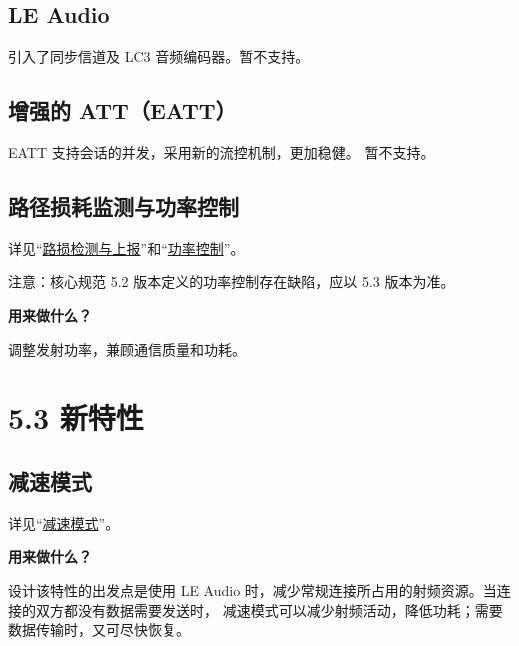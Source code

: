 \documentclass[
  12pt,
]{book}
\makeatletter
\newenvironment{kframe}{%
\medskip{}
\setlength{\fboxsep}{.8em}
 \def\at@end@of@kframe{}%
 \ifinner\ifhmode%
  \def\at@end@of@kframe{\end{minipage}}%
  \begin{minipage}{\columnwidth}%
 \fi\fi%
 \def\FrameCommand##1{\hskip\@totalleftmargin \hskip-\fboxsep
 \colorbox{shadecolor}{##1}\hskip-\fboxsep
     \hskip-\linewidth \hskip-\@totalleftmargin \hskip\columnwidth}%
 \MakeFramed {\advance\hsize-\width
   \@totalleftmargin\z@ \linewidth\hsize
   \@setminipage}}%
 {\par\unskip\endMakeFramed%
 \at@end@of@kframe}
\newenvironment{rmdblock}[1]
  {
  \begin{itemize}
  \renewcommand{\labelitemi}{
    \raisebox{-.7\height}[0pt][0pt]{
      {\setkeys{Gin}{width=3em,keepaspectratio}\texttt{[image: images/\#1]}}
    }
  }
  \setlength{\fboxsep}{1em}
  \begin{kframe}
  \item
  }
  {
  \end{kframe}
  \end{itemize}
  }
\newenvironment{rmdnote}
  {\begin{rmdblock}{note}}
  {\end{rmdblock}}
\makeatother
\begin{document}
\hypertarget{le-audio}{%
\subsection{LE Audio}\label{le-audio}}

引入了同步信道及 LC3 音频编码器。暂不支持。

\hypertarget{ux589eux5f3aux7684-atteatt}{%
\subsection{增强的 ATT（EATT）}\label{ux589eux5f3aux7684-atteatt}}

EATT 支持会话的并发，采用新的流控机制，更加稳健。 暂不支持。

\hypertarget{ux8defux5f84ux635fux8017ux76d1ux6d4bux4e0eux529fux7387ux63a7ux5236}{%
\subsection{路径损耗监测与功率控制}\label{ux8defux5f84ux635fux8017ux76d1ux6d4bux4e0eux529fux7387ux63a7ux5236}}

详见``\protect\hyperlink{ch-conn-pathloss}{路损检测与上报}''和``\protect\hyperlink{ch-conn-power-ctrl}{功率控制}''。

注意：核心规范 5.2 版本定义的功率控制存在缺陷，应以 5.3 版本为准。

\begin{rmdnote}
\textbf{用来做什么？}

调整发射功率，兼顾通信质量和功耗。
\end{rmdnote}

\hypertarget{ux65b0ux7279ux6027-3}{%
\section{5.3 新特性}\label{ux65b0ux7279ux6027-3}}

\hypertarget{ux51cfux901fux6a21ux5f0f}{%
\subsection{减速模式}\label{ux51cfux901fux6a21ux5f0f}}

详见``\protect\hyperlink{ch-conn-subrating}{减速模式}''。

\begin{rmdnote}
\textbf{用来做什么？}

设计该特性的出发点是使用 LE Audio
时，减少常规连接所占用的射频资源。当连接的双方都没有数据需要发送时，
减速模式可以减少射频活动，降低功耗；需要数据传输时，又可尽快恢复。
\end{rmdnote}
\end{document}
